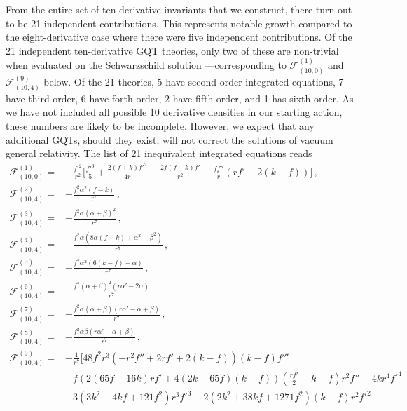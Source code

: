 \documentclass[11pt]{article}
\begin{document}
{From the entire set of ten-derivative invariants that we construct, there turn out to be 21 independent contributions. This represents notable growth compared to the eight-derivative case where there were five independent contributions. Of the 21 independent ten-derivative GQT theories, only two of these are non-trivial when evaluated on the Schwarzschild solution ---corresponding to $\mathcal{F}_{(10, 0)}^{(1)}$ and $\mathcal{F}_{(10, 4)}^{(9)}$ below. Of the 21 theories, 5 have second-order integrated equations, 7 have third-order, 6 have forth-order, 2 have fifth-order, and 1 has sixth-order. As we have not included all possible 10 derivative densities in our starting action, these numbers are likely to be incomplete. However, we expect that any additional GQTs, should they exist, will not correct the solutions of vacuum general relativity. The list of 21 inequivalent integrated equations reads
\begin{align}
\mathcal{F}_{(10, 0)}^{(1)} =&+ \frac{f'^2}{r^2} \bigg[\frac{f'^3}{5} + \frac{2(f+k) f'^2}{4 r} - \frac{2f(f-k)f'}{r^2} - \frac{f f''}{r} \left( r f' + 2(k-f) \right) \bigg] \, ,
\\
\mathcal{F}_{(10, 4)}^{(2)} =&+ \frac{f^2 \alpha^2 (f-k)}{r^7} \, , 
\\
\mathcal{F}_{(10, 4)}^{(3)} =&+ \frac{f^2 \alpha (\alpha + \beta)^2}{r^7} \, ,
\\
\mathcal{F}_{(10, 4)}^{(4)} =&+ \frac{f^2 \alpha \left( 8 \alpha (f-k)  + \alpha^2 - \beta^2 \right)}{r^7} \, ,
\\
\mathcal{F}_{(10, 4)}^{(5)} =&+ \frac{f^2 \alpha^2 \left(6(k-f) - \alpha \right)}{r^7} \, ,
\\
\mathcal{F}_{(10, 4)}^{(6)} =&+ \frac{f^2 (\alpha + \beta)^2 \left(r \alpha' - 2 \alpha  \right)}{r^7} 
\\ 
\mathcal{F}_{(10, 4)}^{(7)} =&+ \frac{f^2 \alpha (\alpha + \beta) \left( r \alpha' - \alpha + \beta \right)}{r^7} \, ,
\\
\mathcal{F}_{(10, 4)}^{(8)} =& -\frac{f^2 \alpha \beta \left(r \alpha' - \alpha + \beta \right)}{r^7}  \, , 
\\
\mathcal{F}_{(10, 4)}^{(9)} =&+ \frac{1}{r^7} \bigg[ 48 f^2 r^3 \left(-r^2 f'' + 2 r f' + 2 (k-f) \right) (k-f) f''' 
\nonumber
\\
&+  f \left(2 \left( 65 f + 16 k \right) r f' 
+ 4 \left(2 k - 65 f \right) (k-f) \right) \left(\frac{r f'}{2} + k - f \right) r^2 f'' - 4 k r^4 f'^4 
\nonumber
\\
&- 3 \left(3 k^2 + 4 k f + 121 f^2 \right) r^3 f'^3 - 2 \left(2 k^2 + 38 k f + 1271 f^2 \right)(k-f) r^2 f'^2 

\end{align}}
\end{document}
